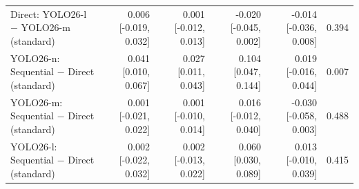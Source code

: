 \begin{table}[htbp]
{\begin{tabular}{lrrrrr}
Direct: YOLO26-l $-$ YOLO26-m (standard) & 0.006 [-0.019, 0.032] & 0.001 [-0.012, 0.013] & -0.020 [-0.045, 0.002] & -0.014 [-0.036, 0.008] & 0.394 \\
YOLO26-n: Sequential $-$ Direct (standard) & 0.041 [0.010, 0.067] & 0.027 [0.011, 0.043] & 0.104 [0.047, 0.144] & 0.019 [-0.016, 0.044] & 0.007 \\
YOLO26-m: Sequential $-$ Direct (standard) & 0.001 [-0.021, 0.022] & 0.001 [-0.010, 0.014] & 0.016 [-0.012, 0.040] & -0.030 [-0.058, 0.003] & 0.488 \\
YOLO26-l: Sequential $-$ Direct (standard) & 0.002 [-0.022, 0.032] & 0.002 [-0.013, 0.022] & 0.060 [0.030, 0.089] & 0.013 [-0.010, 0.039] & 0.415 \\
\bottomrule
\end{tabular}
}
\end{table}
